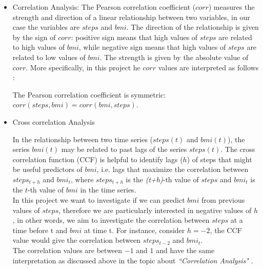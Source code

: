 \documentclass[11pt]{iopart}
\begin{document}
\begin{itemize}
\item Correlation Analysis:
The Pearson correlation coefficient ($corr$) measures the strength and direction of a linear relationship between two variables, in our case the variables are  $steps$ and $bmi$. 
The direction of the relationship is given by the sign of $corr$: positive sign means that high values of $steps$ are related to high values of $bmi$, while negative sign means that high values of $steps$ are related to low values of $bmi$. The strength is given by the absolute value of $corr$.
More specifically, in this project he $corr$ values are interpreted as follows :


The Pearson correlation coefficient is symmetric: $corr(steps,bmi) = corr(bmi,steps)$.
\\


\item Cross correlation Analysis

In the relationship between two time series ($steps(t)$ and $bmi(t)$), the series $bmi(t)$ may be related to past lags of the series $steps(t)$.  
The cross correlation function (CCF) is helpful to identify lags ($h$) of steps that might be useful predictors of $bmi$, i.e. lags that maximize the correlation between 
$steps_{t+h}$ and $bmi_{t}$, where $steps_{t+h}$ is the \textit{(t+h)}-th value of $steps$ and $bmi_{t}$ is the $t$-th value of $bmi$ in the time series.
\\
In this project we want to investigate if we can predict $bmi$ from previous values of $steps$, therefore we are particularly interested in negative values  of $h$, in other words, we aim to investigate the correlation between $steps$ at a time before t and $bmi$ at time t.   For instance, consider $h = -2$, the CCF value would give the correlation between $steps_{t-2}$ and $bmi_t$.
\\
The correlation values are between $-1$ and $1$ and have the same interpretation as discussed above in the topic about \textit{``Correlation Analysis" }.
\\ 


\end{itemize}
\end{document}
